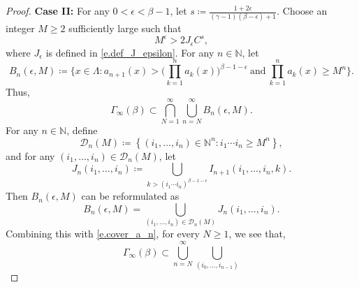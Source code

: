 \documentclass[10pt,a4paper]{amsart}
\begin{document}
\begin{proof}
 \textbf{Case II: } For any $0<\epsilon<\beta-1$, let $s\coloneqq \frac{1+2\epsilon}{(\gamma-1)(\beta-\epsilon)+1}$. Choose an integer $M\geq 2$ sufficiently large such that
        \begin{equation}\label{e.def_M}
                M^{\epsilon}> 2J_{\epsilon}C^s,
        \end{equation}
        where $J_{\epsilon}$ is defined in \eqref{e.def_J_epsilon}.
For any $n \in \mathbb N$, let
        \begin{equation}\label{e.def_B_n_ep_M}
                B_n(\epsilon,M)\coloneqq
                \Big\{
                x\in  \Lambda:
                a_{n+1}(x)>\big(
                        \prod_{k=1}^{n}
                        a_k(x)
                        \big)^{\beta-1-\epsilon}\ \text{and}\
                \prod_{k=1}^{n}
                a_k(x)\geq M^n
                \Big\}.
                \end{equation}
   Thus,
        \begin{equation}\label{e.cover_a_n}
                {\Gamma}_{\infty}(\beta)
                \subset \bigcap_{N=1}^{\infty}
                \bigcup_{n=N}^{\infty}
                B_n(\epsilon,M).
        \end{equation}
For any $n \in \mathbb N$, define
        \begin{equation}\label{e.def_D_n}
            \mathcal{D} _n(M)\coloneqq
        \left\{(i_1,\dots, i_{n})\in
        \mathbb{N}^n:
        i_1\cdots i_{n}\geq M^n\right\},
        \end{equation}
 and for any $(i_1,\dots, i_{n})
        \in \mathcal{D} _n(M)$, let
        \begin{equation}\label{e.def_J_n_another}
                J_n(i_1,\dots,i_{n}) \coloneqq
                \bigcup_{k>(i_1\cdots i_{n})
                ^{\beta-1-\epsilon}} I_{n+1}(i_1,\dots,i_{n},k).
        \end{equation}
Then $B_n(\epsilon,M)$ can be reformulated as
        \begin{equation}\label{e.a_n_J_n}
                B_n(\epsilon,M)=
                \bigcup_{(i_1,\dots, i_{n})
                \in \mathcal{D} _n(M)}
                J_n(i_1,\dots,i_{n}).
        \end{equation}
 Combining this with \eqref{e.cover_a_n}, for every $N\geq 1$, we see that,
        \begin{equation}\label{e.cover_by_J}
                {\Gamma}_{\infty}(\beta)\subset
                \bigcup^\infty_{n=N}\bigcup_{(i_0,\dots, i_{n-1})
}
\end{equation}
\end{proof}
\end{document}
